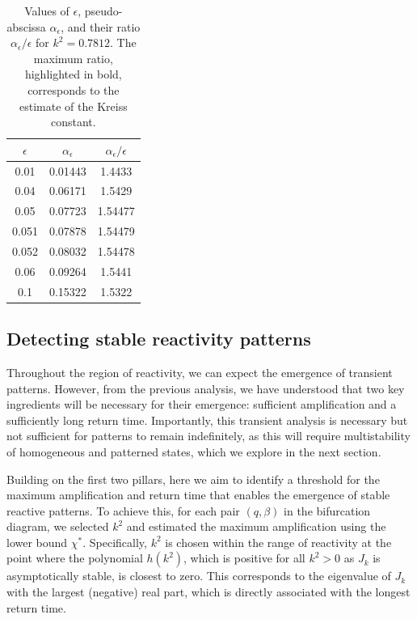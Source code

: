 \documentclass{article}
\newcommand{\jac}{J_{k}}
\begin{document}
\begin{table}[ht]
\centering
\begin{tabular}{|c|c|c|}
 \hline
$\epsilon$ & $\alpha_\epsilon$ & $\alpha_\epsilon/\epsilon$ \\  \hline
0.01 & 0.01443 & 1.4433 \\  \hline
0.04 & 0.06171 & 1.5429 \\  \hline
0.05 & 0.07723 & 1.54477 \\  \hline
0.051 & 0.07878& {1.54479} \\  \hline
0.052 & 0.08032  & 1.54478 \\  \hline
0.06 & 0.09264 & 1.5441 \\  \hline
0.1  & 0.15322  & 1.5322 \\
 \hline
\end{tabular}
\caption{Values of $\epsilon$, pseudo-abscissa $\alpha_\epsilon$, and their ratio $\alpha_\epsilon / \epsilon$ for $k^2 = 0.7812$. The maximum ratio,  highlighted in bold, corresponds to the estimate of the Kreiss constant.}
\label{tab:updated_values}
\end{table}


\subsection{Detecting stable reactivity patterns}

Throughout the region of reactivity, we can expect the emergence of transient patterns. However, from the previous analysis, we have understood that two key ingredients will be necessary for their emergence: sufficient amplification and a sufficiently long return time. {Importantly, this transient analysis is necessary but not sufficient for patterns to remain indefinitely, as this will require multistability of homogeneous and patterned states, which we explore in the next section.}


 Building on the {first} two pillars, here we aim to identify a threshold for the maximum amplification and return time that enables the emergence of stable reactive patterns. To achieve this, for each pair \((q, \beta)\) in the bifurcation diagram, we selected \(k^2\) and estimated the maximum amplification using the lower bound \(\chi^*\). Specifically, \(k^2\) is chosen within the range of reactivity at the point where the polynomial \(h(k^2)\), which is positive for all \(k^2 > 0\) as \(\jac\) is asymptotically stable, is closest to zero. This corresponds to the eigenvalue of \(\jac\) with the largest (negative) real part, which is directly associated with the longest return time. 
\end{document}
